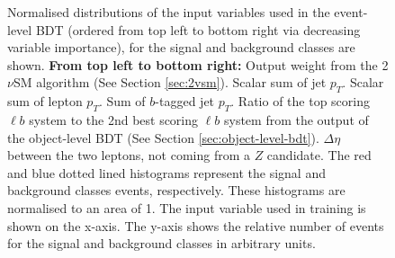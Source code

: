 \begin{figure}[h!]
    \caption{Normalised distributions of the input variables used in the event-level BDT (ordered from top left to bottom right via decreasing variable importance), for the signal and background classes are shown. \textbf{From top left to bottom right:} Output weight from the 2$\nu$SM algorithm (See Section \ref{sec:2vsm}). Scalar sum of jet $p_{T}$. Scalar sum of lepton $p_{T}$. Sum of $b$-tagged jet $p_{T}$. Ratio of the top scoring $\ell b$ system to the 2nd best scoring $\ell b$ system from the output of the object-level BDT (See Section \ref{sec:object-level-bdt}). $\Delta \eta$ between the two leptons, not coming from a $Z$ candidate. The red and blue dotted lined histograms represent the signal and background classes events, respectively. These histograms are normalised to an area of 1. The input variable used in training is shown on the x-axis. The y-axis shows the relative number of events for the signal and background classes in arbitrary units. }
    \label{fig:norm-event-bdt-vars}
\end{figure}

